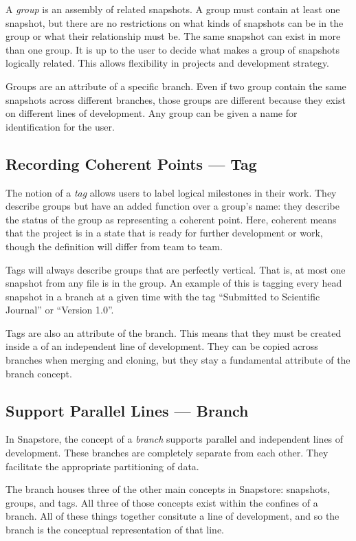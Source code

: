 A \textit{group} is an assembly of related snapshots. A group must contain at least one snapshot, but there are no restrictions on what kinds of snapshots can be in the group or what their relationship must be. The same snapshot can exist in more than one group. It is up to the user to decide what makes a group of snapshots logically related. This allows flexibility in projects and development strategy.

Groups are an attribute of a specific branch. Even if two group contain the same snapshots across different branches, those groups are different because they exist on different lines of development. Any group can be given a name for identification for the user.

\subsection{Recording Coherent Points --- Tag}

The notion of a \textit{tag} allows users to label logical milestones in their work. They describe groups but have an added function over a group's name: they describe the status of the group as representing a coherent point. Here, coherent means that the project is in a state that is ready for further development or work, though the definition will differ from team to team\cite{RossoJackson}. 

Tags will always describe groups that are perfectly vertical. That is, at most one snapshot from any file is in the group. An example of this is tagging every head snapshot in a branch at a given time with the tag ``Submitted to Scientific Journal'' or ``Version 1.0''.

Tags are also an attribute of the branch. This means that they must be created inside a of an independent line of development. They can be copied across branches when merging and cloning, but they stay a fundamental attribute of the branch concept.

\subsection{Support Parallel Lines --- Branch}

In Snapstore, the concept of a \textit{branch} supports parallel and independent lines of development. These branches are completely separate from each other. They facilitate the appropriate partitioning of data.

The branch houses three of the other main concepts in Snapstore: snapshots, groups, and tags. All three of those concepts exist within the confines of a branch. All of these things together consitute a line of development, and so the branch is the conceptual representation of that line.

